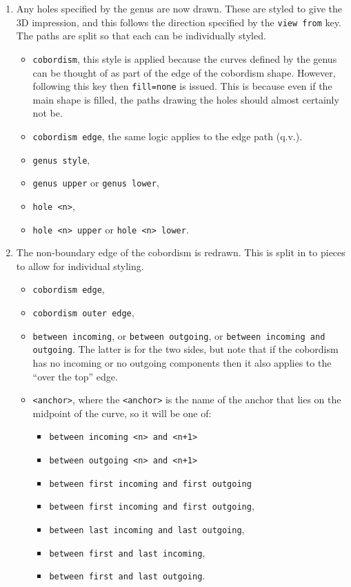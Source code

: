 \documentclass{ltxdoc}
\begin{document}
\begin{enumerate}
\item Any holes specified by the genus are now drawn.
These are styled to give the 3D impression, and this follows the direction specified by the \Verb+view from+ key.
The paths are split so that each can be individually styled.

\begin{itemize}
\item \Verb+cobordism+, this style is applied because the curves defined by the genus can be thought of as part of the edge of the cobordism shape.
However, following this key then \Verb+fill=none+ is issued.
This is because even if the main shape is filled, the paths drawing the holes should almost certainly not be.
\item \Verb+cobordism edge+, the same logic applies to the edge path (q.v.).
\item \Verb+genus style+,
\item \Verb+genus upper+ or \Verb+genus lower+,
\item \Verb+hole <n>+,
\item \Verb+hole <n> upper+ or \Verb+hole <n> lower+.
\end{itemize}

\item The non-boundary edge of the cobordism is redrawn.
This is split in to pieces to allow for individual styling.

\begin{itemize}
\item \Verb+cobordism edge+,
\item \Verb+cobordism outer edge+,
\item \Verb+between incoming+, or \Verb+between outgoing+, or \Verb+between incoming and outgoing+.
The latter is for the two sides, but note that if the cobordism has no incoming or no outgoing components then it also applies to the ``over the top'' edge.
\item \Verb+<anchor>+, where the \Verb+<anchor>+ is the name of the anchor that lies on the midpoint of the curve, so it will be one of:
%
\begin{itemize}
\item \Verb=between incoming <n> and <n+1>=
\item \Verb=between outgoing <n> and <n+1>=
\item \Verb+between first incoming and first outgoing+
\item \Verb+between first incoming and first outgoing+,
\item \Verb+between last incoming and last outgoing+,
\item \Verb+between first and last incoming+,
\item \Verb+between first and last outgoing+.
\end{itemize}
\end{itemize}


\end{enumerate}
\end{document}
